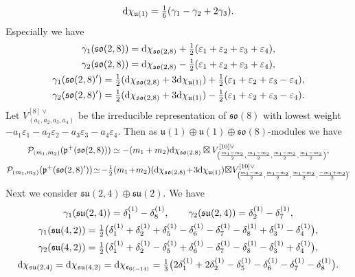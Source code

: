 \documentclass[pdftex]{sigma}
\numberwithin{equation}{section}
\newcommand{\fp}{\mathfrak{p}}
\newcommand{\cP}{\mathcal{P}}
\newcommand{\ve}{\varepsilon}
\begin{document}
\begin{gather*} {\rm d}\chi_{\mathfrak{u}(1)}=\tfrac{1}{6}(\gamma_1-\gamma_2+2\gamma_3). \end{gather*}
Especially we have
\begin{gather*}
\gamma_1(\mathfrak{so}(2,8))={\rm d}\chi_{\mathfrak{so}(2,8)}+\tfrac{1}{2}(\ve_1+\ve_2+\ve_3+\ve_4),\\
\gamma_2(\mathfrak{so}(2,8))={\rm d}\chi_{\mathfrak{so}(2,8)}-\tfrac{1}{2}(\ve_1+\ve_2+\ve_3+\ve_4),\\
\gamma_1(\mathfrak{so}(2,8)')=\tfrac{1}{2}({\rm d}\chi_{\mathfrak{so}(2,8)}+3{\rm d}\chi_{\mathfrak{u}(1)})+\tfrac{1}{2}(\ve_1+\ve_2+\ve_3-\ve_4),\\
\gamma_2(\mathfrak{so}(2,8)')=\tfrac{1}{2}({\rm d}\chi_{\mathfrak{so}(2,8)}+3{\rm d}\chi_{\mathfrak{u}(1)})-\tfrac{1}{2}(\ve_1+\ve_2+\ve_3-\ve_4).
\end{gather*}
Let $V_{(a_1,a_2,a_3,a_4)}^{[8]\vee}$ be the irreducible representation of $\mathfrak{so}(8)$ with lowest weight
$-a_1\ve_1-a_2\ve_2-a_3\ve_3-a_4\ve_4$. Then as $\mathfrak{u}(1)\oplus\mathfrak{u}(1)\oplus\mathfrak{so}(8)$-modules we have
\begin{gather*}
\cP_{(m_1,m_2)}(\fp^+(\mathfrak{so}(2,8))) \simeq -(m_1+m_2){\rm d}\chi_{\mathfrak{so}(2,8)}
\boxtimes V_{\left(\frac{m_1-m_2}{2},\frac{m_1-m_2}{2},\frac{m_1-m_2}{2},\frac{m_1-m_2}{2}\right)}^{[10]\vee},\\
\cP_{(m_1,m_2)}(\fp^+(\mathfrak{so}(2,8)')) \!\simeq\! -\tfrac12 (m_1 \!+\! m_2)({\rm d}\chi_{\mathfrak{so}(2,8)}\! + \!3{\rm d}\chi_{\mathfrak{u}(1)})
\! \boxtimes\! V_{\left(\!\frac{m_1{-}m_2}{2}{,}\frac{m_1{-}m_2}{2}{,}\frac{m_1{-}m_2}{2}{,}\frac{-m_1{+}m_2}{2}\!\right)}^{[10]\vee}\!.
\end{gather*}
Next we consider $\mathfrak{su}(2,4)\oplus\mathfrak{su}(2)$. We have
\begin{gather*}
\gamma_1(\mathfrak{su}(2,4))=\delta_1^{(1)}-\delta_8^{(1)},\qquad
\gamma_2(\mathfrak{su}(2,4))=\delta_2^{(1)}-\delta_7^{(1)},\\
\gamma_1(\mathfrak{su}(4,2))=\tfrac{1}{2}\big(\delta_1^{(1)}+\delta_2^{(1)}+\delta_5^{(1)}-\delta_6^{(1)}-\delta_7^{(1)}-\delta_8^{(1)}+\delta_3^{(1)}-\delta_4^{(1)}\big),\\
\gamma_2(\mathfrak{su}(4,2))
=\tfrac{1}{2}\big(\delta_1^{(1)}+\delta_2^{(1)}-\delta_5^{(1)}+\delta_6^{(1)}-\delta_7^{(1)}-\delta_8^{(1)}-\delta_3^{(1)}+\delta_4^{(1)}\big),\\
{\rm d}\chi_{\mathfrak{su}(2,4)}={\rm d}\chi_{\mathfrak{su}(4,2)}={\rm d}\chi_{\mathfrak{e}_{6(-14)}}
=\tfrac{1}{3}\big(2\delta_1^{(1)}+2\delta_2^{(1)}-\delta_5^{(1)}-\delta_6^{(1)}-\delta_7^{(1)}-\delta_8^{(1)}\big).
\end{gather*}
\end{document}
